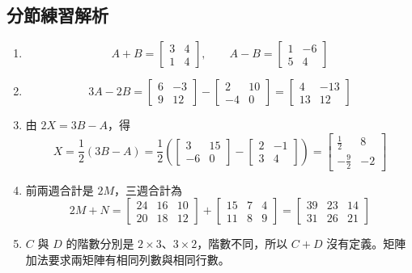 \documentclass[11pt,a4paper]{article}
\begin{document}
\subsection{分節練習解析}\label{ux5206ux7bc0ux7df4ux7fd2ux89e3ux6790-1}

\begin{enumerate}
\def\labelenumi{\arabic{enumi}.}
\item
  \[
   A+B=\begin{bmatrix}3&4\\1&4\end{bmatrix},
   \qquad
   A-B=\begin{bmatrix}1&-6\\5&4\end{bmatrix}
   \]
\item
  \[
   3A-2B
   =\begin{bmatrix}6&-3\\9&12\end{bmatrix}
   -\begin{bmatrix}2&10\\-4&0\end{bmatrix}
   =\begin{bmatrix}4&-13\\13&12\end{bmatrix}
   \]
\item
  由 \(2X=3B-A\)，得
  \[
  X=\frac12(3B-A)
  =\frac12\left(
  \begin{bmatrix}3&15\\-6&0\end{bmatrix}
  -\begin{bmatrix}2&-1\\3&4\end{bmatrix}
  \right)
  =\begin{bmatrix}\frac12&8\\-\frac92&-2\end{bmatrix}
  \]
\item
  前兩週合計是 \(2M\)，三週合計為
  \[
  2M+N
  =\begin{bmatrix}24&16&10\\20&18&12\end{bmatrix}
  +\begin{bmatrix}15&7&4\\11&8&9\end{bmatrix}
  =\begin{bmatrix}39&23&14\\31&26&21\end{bmatrix}
  \]
\item
  \(C\) 與 \(D\) 的階數分別是 \(2\times3\)、\(3\times2\)，階數不同，所以 \(C+D\) 沒有定義。矩陣加法要求兩矩陣有相同列數與相同行數。
\end{enumerate}
\end{document}
